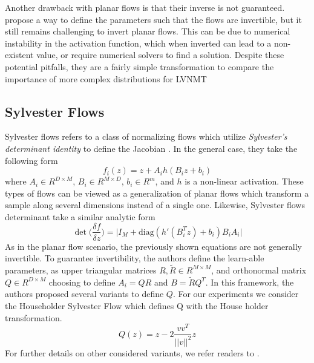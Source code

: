 
Another drawback with planar flows is that their inverse is not guaranteed. \citet{rezende2015VIwithNF} propose a way to define the parameters such that the flows are invertible, but it still remains challenging to invert planar flows. This can be due to numerical instability in the activation function, which when inverted can lead to a non-existent value, or require numerical solvers to find a solution. Despite these potential pitfalls, they are a fairly simple transformation to compare the importance of more complex distributions for \ac{LVNMT}



\subsection{Sylvester Flows}

Sylvester flows refers to a class of normalizing flows which utilize \textit{Sylvester's determinant identity} to define the Jacobian \cite{vdberg2018sylvester}. In the general case, they take the following form
\begin{equation}
	f_{i}(z) = z + A_{i} h(B_{i}z + b_{i})
\end{equation}
where $A_{i} \in R^{D \times M}$, $B_{i} \in R^{M \times D}$, $b_{i} \in R^{m}$, and $h$ is a non-linear activation. These types of flows can be viewed as a generalization of planar flows which transform a sample along several dimensions instead of a single one. Likewise, Sylvester flows determinant take a similar analytic form
\begin{equation} 
	\det \bigg( \frac{\delta f}{\delta z} \bigg) = \bigg| I_{M} + \text{diag} ( h'(B_{i}^{T} z ) + b_{i})B_{i}A_{i} \bigg|
\end{equation}
As in the planar flow scenario, the previously shown equations are not generally invertible. To guarantee invertibility, the authors define the learn-able parameters, as upper triangular matrices $R, \tilde{R} \in R^{M \times M}$, and orthonormal matrix $Q \in R^{D \times M}$ choosing to define $A_{i} = QR$ and $B=\tilde{R}Q^{T}$. In this framework, the authors proposed several variants to define $Q$. For our experiments we consider the Householder Sylvester Flow which defines Q with the House holder transformation.
\begin{equation}
	Q(z) = z - 2 \frac{vv^{T}}{||v||^{2}} z
\end{equation}
For further details on other considered variants, we refer readers to \citet{vdberg2018sylvester}. 

